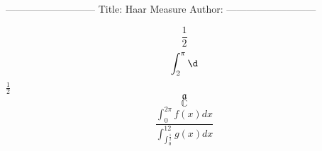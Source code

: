 ---------------------------
Title: Haar Measure 
Author: 
---------------------------

\[\frac{1}{2}\]
\[\int_2^\pi\d\]
$\frac{1}{2}$
\[\mathfrak{a}\]
\[\mathbb{C}\]
\[\frac{\int_0^{2\pi}f(x)dx}{\int_{\int_0^\frac{1}{2}}^{12}g(x)dx}\]

